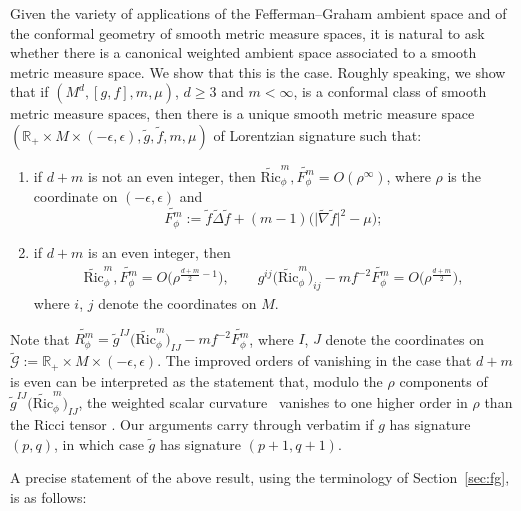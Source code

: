\documentclass[pdftex]{sigma}
\DeclareMathOperator{\Ric}{Ric}
\newcommand{\cR}{\widetilde{R}}
\newcommand{\cRic}{\widetilde{\Ric}}
\numberwithin{equation}{section}
\begin{document}
Given the variety of applications of the Fefferman--Graham ambient space and of the conformal geometry of smooth metric measure spaces, it is natural to ask whether there is a canonical weighted ambient space associated to a smooth metric measure space. We show that this is the case.
Roughly speaking, we show that if $(M^d,[g,f],m,\mu)$, $d\geq 3$ and $m<\infty$, is a conformal class of smooth metric measure spaces, then there is a unique smooth metric measure space $(\mathbb{R}_+\times M\times (-\epsilon,\epsilon),\widetilde{g},\widetilde{f},m,\mu)$ of Lorentzian signature such that:
\begin{enumerate}[label=$(\roman*)$]\itemsep=0pt
\item if $d+m$ is not an even integer, then $\widetilde{\mathrm{Ric}}_\phi^m,\widetilde{F_\phi^m}=O(\rho^\infty)$, where $\rho$ is the coordinate on $(-\epsilon,\epsilon)$ and
 \[
 \widetilde{F_\phi^m}:=\widetilde{f}\widetilde{\Delta}\widetilde{f}+(m-1)\bigl(\big|\widetilde{\nabla} \widetilde{f}\big|^2-\mu\bigr);
 \]

\item if $d+m$ is an even integer, then
\begin{gather*}
 \widetilde{\mathrm{Ric}}_\phi^m,\widetilde{F_\phi^m}=O\bigl(\rho^{\frac{d+m}{2}-1}\bigr),
 \qquad
 g^{ij}\bigl(\widetilde{\mathrm{Ric}}_\phi^m\bigr)_{ij}-{m}{f}^{-2} \widetilde{F_\phi^m}=O\bigl(\rho^{\frac{d+m}{2}}\bigr),
\end{gather*}
where $i$, $j$ denote the coordinates on $M$.
\end{enumerate}
Note that $\widetilde{R_\phi^m}=\widetilde{g}^{IJ}\big(\widetilde{\mathrm{Ric}}_\phi^m\big)_{IJ}-m f^{-2}\widetilde{F_\phi^m}$, where $I$, $J$ denote the coordinates on $\widetilde{\mathcal{G}}:=\mathbb{R}_+\times M\times (-\epsilon,\epsilon)$. The improved orders of vanishing in the case that $d+m$ is even can be interpreted as the statement that, modulo the $\rho$ components of $\widetilde{g}^{IJ}\big(\widetilde{\mathrm{Ric}}_\phi^m\big)_{IJ}$,
the weighted scalar curvature~\smash{$\cR_\phi^m$} vanishes to one higher order in $\rho$ than the  Ricci tensor \smash{$\cRic_\phi^m$}. Our arguments carry through verbatim if $g$ has signature $(p,q)$, in which case $\widetilde{g}$ has signature $(p+1,q+1)$.

A precise statement of the above result, using the terminology of Section~\ref{sec:fg}, is as follows:
\end{document}
